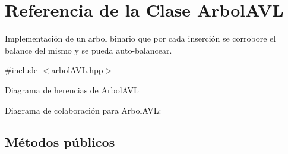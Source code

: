 \hypertarget{classArbolAVL}{}\section{Referencia de la Clase Arbol\+A\+VL}
\label{classArbolAVL}


Implementación de un arbol binario que por cada inserción se corrobore el balance del mismo y se pueda auto-\/balancear.  




{\ttfamily \#include $<$arbol\+A\+V\+L.\+hpp$>$}



Diagrama de herencias de Arbol\+A\+VL


Diagrama de colaboración para Arbol\+A\+VL\+:
\subsection*{Métodos públicos}
